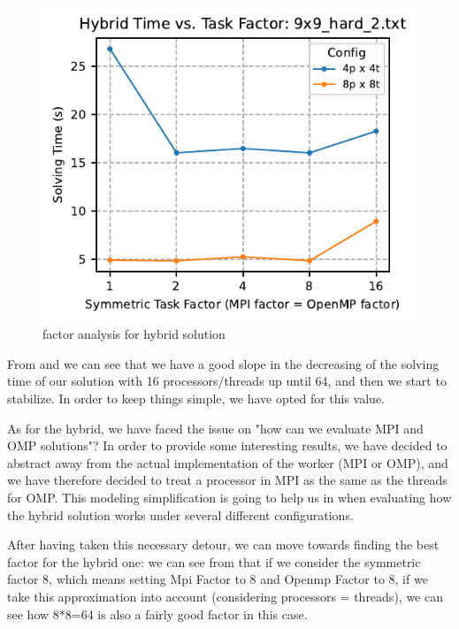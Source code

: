 \begin{figure}[htbp]
\centering
\includegraphics[width=0.9\linewidth]{imgs/factor_hybrid_9x9_hard_2.pdf}
\caption{factor analysis for hybrid solution}
\label{fig:factor_analysis_hybrid}
\end{figure}

From  and  we can see that we have a good slope in the decreasing of the solving time of our solution with 16 processors/threads up until 64, and then we start to stabilize. In order to keep things simple, we have opted for this value.

As for the hybrid, we have faced the issue on "how can we evaluate MPI and OMP solutions"? In order to provide some interesting results, we have decided to abstract away from the actual implementation of the worker (MPI or OMP), and we have therefore decided to treat a processor in MPI as the same as the threads for OMP. This modeling simplification is going to help us in  when evaluating how the hybrid solution works under several different configurations.

After having taken this necessary detour, we can move towards finding the best factor for the hybrid one: we can see from  that if we consider the symmetric factor 8, which means setting Mpi Factor to 8 and Openmp Factor to 8, if we take this approximation into account (considering processors = threads), we can see how 8*8=64 is also a fairly good factor in this case.


